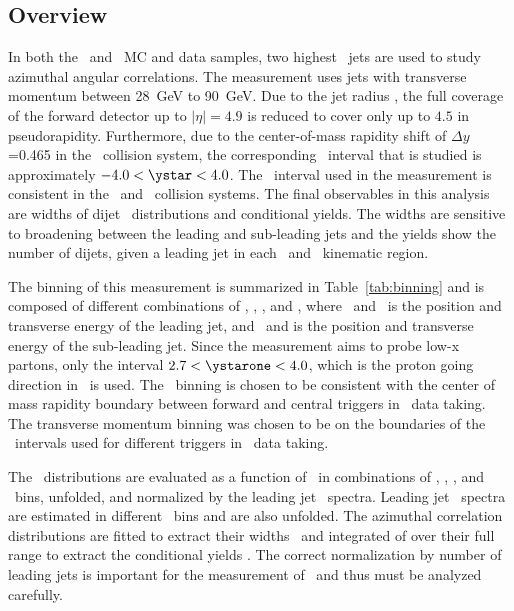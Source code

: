 
\subsection{Overview}
In both the \pp\ and \pPb\ MC and data samples, two highest \pt\ jets are used to study azimuthal angular correlations. The measurement uses jets with transverse momentum between 28~GeV to 90~GeV. Due to the jet radius \RFour, the full coverage of the forward detector up to $|\eta|=4.9$ is reduced to cover only up to $4.5$ in pseudorapidity. Furthermore, due to the center-of-mass rapidity shift of $\Delta y$=0.465 in the \pPb\ collision system, the corresponding \ystar\ interval that is studied is approximately $-4.0<\ystar<4.0$. The \ystar\ interval used in the measurement is consistent in the \pp\ and \pPb\ collision systems. The final observables in this analysis are widths of dijet \conetwo\ distributions and conditional yields. The widths are sensitive to broadening between the leading and sub-leading jets and the yields show the number of dijets, given a leading jet in each \pT\ and \ystar\ kinematic region. 

The binning of this measurement is summarized in  Table~\ref{tab:binning} and is composed of different combinations of \ystarone, \ystartwo, \ptone, and \pttwo, where \ystarone\ and \ptone\ is the position and transverse energy of the leading jet, and \ystartwo\ and \pttwo is the position and transverse energy of the sub-leading jet. Since the measurement aims to probe low-x partons, only the interval $2.7<\ystarone<4.0$, which is the proton going direction in \pPb\ is used. The \ystar\ binning is chosen to be consistent with the center of mass rapidity boundary between forward and central triggers in \pPb\ data taking. The transverse momentum binning was chosen to be on the boundaries of the \pt\ intervals used for different triggers in \pp\ data taking. 

The \conetwo\ distributions are evaluated as a function of \Dphi\ in combinations of \ystarone, \ystartwo, \ptone, and \pttwo\ bins, unfolded, and normalized by the leading jet \pt\ spectra. Leading jet \ptone\ spectra are estimated in different \ystarone\ bins and are also unfolded. The azimuthal correlation distributions are fitted to extract their widths  \wonetwo\ and integrated of over their full range to extract the conditional yields \ionetwo. The correct normalization by number of leading jets is important for the measurement of \ionetwo\ and thus must be analyzed carefully. 

